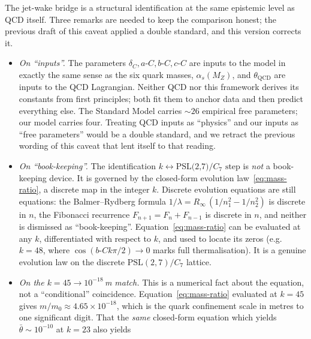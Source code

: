 \documentclass[11pt,a4paper]{article}
\newcommand{\dC}{\delta_C}
\newcommand{\aC}{a\text{-}C}
\newcommand{\bC}{b\text{-}C}
\newcommand{\cC}{c\text{-}C}
\newcommand{\PSL}{\mathrm{PSL}}
\theoremstyle{plain}
\theoremstyle{definition}
\theoremstyle{remark}
\begin{document}
\begin{caveat}
The jet-wake bridge is a structural identification at the same
epistemic level as QCD itself.  Three remarks are needed to keep
the comparison honest; the previous draft of this caveat applied
a double standard, and this version corrects it.
\begin{itemize}[leftmargin=2em,itemsep=2pt]
  \item \emph{On ``inputs''.}  The parameters $\dC, \aC, \bC, \cC$
        are inputs to the model in exactly the same sense as the
        six quark masses, $\alpha_s(M_Z)$, and $\theta_{\mathrm{QCD}}$
        are inputs to the QCD Lagrangian.  Neither QCD nor this
        framework derives its constants from first principles; both
        fit them to anchor data and then predict everything else.
        The Standard Model carries $\sim 26$ empirical free
        parameters; our model carries four.  Treating QCD inputs as
        ``physics'' and our inputs as ``free parameters'' would be
        a double standard, and we retract the previous wording of
        this caveat that lent itself to that reading.
  \item \emph{On ``book-keeping''.}  The identification
        $k \leftrightarrow \text{PSL(2,7)/}C_7\text{ step}$ is
        \emph{not} a book-keeping device.  It is governed by the
        closed-form evolution law~\eqref{eq:mass-ratio}, a discrete
        map in the integer $k$.  Discrete evolution equations are
        still equations: the Balmer--Rydberg formula
        $1/\lambda = R_\infty\,(1/n_1^2 - 1/n_2^2)$ is discrete in
        $n$, the Fibonacci recurrence $F_{n+1}=F_n+F_{n-1}$ is
        discrete in $n$, and neither is dismissed as
        ``book-keeping''.  Equation~\eqref{eq:mass-ratio} can be
        evaluated at any $k$, differentiated with respect to $k$,
        and used to locate its zeros (e.g.\ $k=48$, where
        $\cos(\bC k\pi/2)\to 0$ marks full thermalisation).  It is
        a genuine evolution law on the discrete $\PSL(2,7)/C_7$
        lattice.
  \item \emph{On the $k=45 \to 10^{-18}\,$m match.}  This is a
        numerical fact about the equation, not a ``conditional''
        coincidence.  Equation~\eqref{eq:mass-ratio} evaluated at
        $k=45$ gives $m/m_0 \approx 4.65\times 10^{-18}$, which is
        the quark confinement scale in metres to one significant
        digit.  That the \emph{same} closed-form equation which
        yields $\bar\theta \sim 10^{-10}$ at $k=23$ also yields

\end{itemize}
\end{caveat}
\end{document}
